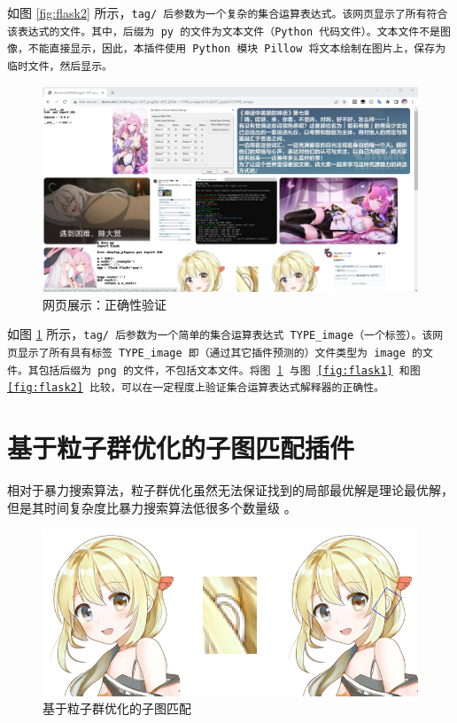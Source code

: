 如图 \ref{fig:flask2} 所示，\tt{tag/} 后参数为一个复杂的集合运算表达式。该网页显示了所有符合该表达式的文件。其中，后缀为 \tt{py} 的文件为文本文件（Python 代码文件）。文本文件不是图像，不能直接显示，因此，本插件使用 Python 模块 Pillow 将文本绘制在图片上，保存为临时文件，然后显示。

\begin{figure}[h]
    \centering
    \includegraphics[width=\textwidth]{figures/flask3.png}
    \caption{网页展示：正确性验证}
    \label{fig:flask3}
\end{figure}

如图 \ref{fig:flask3} 所示，\tt{tag/} 后参数为一个简单的集合运算表达式 \tt{TYPE\_image}（一个标签）。该网页显示了所有具有标签 \tt{TYPE\_image} 即（通过其它插件预测的）文件类型为 \tt{image} 的文件。其包括后缀为 \tt{png} 的文件，不包括文本文件。将图 \ref{fig:flask3} 与图 \ref{fig:flask1} 和图 \ref{fig:flask2} 比较，可以在一定程度上验证集合运算表达式解释器的正确性。

\section{基于粒子群优化的子图匹配插件}

相对于暴力搜索算法，粒子群优化虽然无法保证找到的局部最优解是理论最优解，但是其时间复杂度比暴力搜索算法低很多个数量级 \cite{psoimg2} \cite{psoimg3}。

\begin{figure}[h]
    \centering
    \includegraphics[width=\textwidth]{figures/pso.png}
    \caption{基于粒子群优化的子图匹配}
    \label{fig:pso}
\end{figure}

